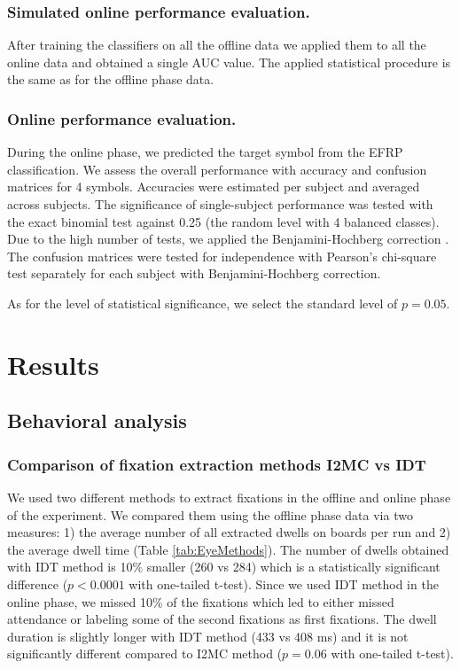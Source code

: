 \documentclass[12pt]{iopart}
\begin{document}
\subsubsection*{Simulated online performance evaluation.}
After training the classifiers on all the offline data we applied them 
to all the online data and obtained a single AUC value.
The applied statistical procedure is the same as for the offline phase data.

\subsubsection*{Online performance evaluation.}
During the online phase, we predicted the target symbol from the EFRP classification.
We assess the overall performance with accuracy and confusion matrices
for 4 symbols. Accuracies were estimated per subject and averaged across subjects.
The significance of single-subject performance was tested with the exact binomial test against
0.25 (the random level with 4 balanced classes). Due to the high number of tests,
we applied the Benjamini-Hochberg correction \cite{benjamini_controlling_1995}.
The confusion matrices were tested for independence
with Pearson's chi-square test \cite{frs_x_1900} separately for each subject 
with Benjamini-Hochberg correction.

As for the level of statistical significance, we select the standard level of $p = 0.05$.

\section{Results}
\label{sec:results}
\subsection{Behavioral analysis}

\subsubsection*{Comparison of fixation extraction methods I2MC vs IDT}
We used two different methods to extract fixations in the offline 
and online phase of the experiment. We compared them using
the offline phase data via two measures: 1) the average number of all extracted
dwells on boards per run and 2) the average dwell time (Table \ref{tab:EyeMethods}).
The number of dwells obtained with IDT method is 10\% smaller (260 vs 284)
which is a statistically significant difference
($p < 0.0001$ with one-tailed t-test).
Since we used IDT method in the online phase,
we missed 10\% of the fixations which led
to either missed attendance or labeling some of the second
fixations as first fixations.
The dwell duration is slightly longer with IDT method (433 vs 408 ms)
and it is not significantly different compared to I2MC method
($p = 0.06$ with one-tailed t-test).
\end{document}
